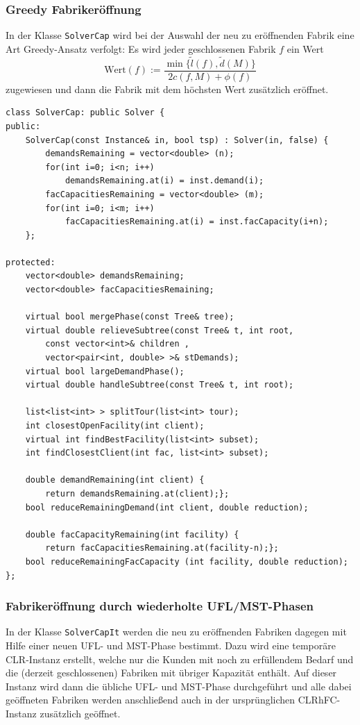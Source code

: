 \documentclass[a4paper,ngerman,11pt,bibtotoc]{scrartcl}
\theoremstyle{definition}
\theoremstyle{plain}
\theoremstyle{remark}
\newcommand{\CLR}{CLR}
\newcommand{\CLRHFC}{CLRhFC}
\newcommand{\MST}{MST}
\newcommand{\UFL}{UFL}
\begin{document}
	\subsubsection{Greedy Fabrikeröffnung}
	
	In der Klasse \lstinline|SolverCap| wird bei der Auswahl der neu zu eröffnenden Fabrik eine Art Greedy-Ansatz verfolgt: Es wird jeder geschlossenen Fabrik $f$ ein Wert
	\[\text{Wert}(f) :=  \frac{\min\{\tilde{l}(f), \tilde{d}(M)\}}{2 c(f,M) + \phi(f)}\]
	zugewiesen und dann die Fabrik mit dem höchsten Wert zusätzlich eröffnet.
	
\begin{lstlisting}[caption=Die Klasse SolverCap]
class SolverCap: public Solver {
public:
	SolverCap(const Instance& in, bool tsp) : Solver(in, false) {
		demandsRemaining = vector<double> (n);
		for(int i=0; i<n; i++) 
			demandsRemaining.at(i) = inst.demand(i);
		facCapacitiesRemaining = vector<double> (m);
		for(int i=0; i<m; i++) 
			facCapacitiesRemaining.at(i) = inst.facCapacity(i+n);
	};

protected:
	vector<double> demandsRemaining;
	vector<double> facCapacitiesRemaining;

	virtual bool mergePhase(const Tree& tree);
	virtual double relieveSubtree(const Tree& t, int root, 
		const vector<int>& children , 
		vector<pair<int, double> >& stDemands);
	virtual bool largeDemandPhase();
	virtual double handleSubtree(const Tree& t, int root);

	list<list<int> > splitTour(list<int> tour);
	int closestOpenFacility(int client);
	virtual int findBestFacility(list<int> subset);
	int findClosestClient(int fac, list<int> subset);

	double demandRemaining(int client) {
		return demandsRemaining.at(client);};
	bool reduceRemainingDemand(int client, double reduction);

	double facCapacityRemaining(int facility) {
		return facCapacitiesRemaining.at(facility-n);};
	bool reduceRemainingFacCapacity (int facility, double reduction);
};
\end{lstlisting}
	
	\subsubsection{Fabrikeröffnung durch wiederholte \UFL/\MST-Phasen}
	
	In der Klasse \lstinline|SolverCapIt| werden die neu zu eröffnenden Fabriken dagegen mit Hilfe einer neuen \UFL- und \MST-Phase bestimmt. Dazu wird eine temporäre \CLR-Instanz erstellt, welche nur die Kunden mit noch zu erfüllendem Bedarf und die (derzeit geschlossenen) Fabriken mit übriger Kapazität enthält. Auf dieser Instanz wird dann die übliche \UFL- und \MST-Phase durchgeführt und alle dabei geöffneten Fabriken werden anschließend auch in der ursprünglichen \CLRHFC-Instanz zusätzlich geöffnet. 
	
\end{document}
